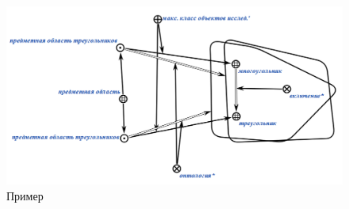\begin{frame}{\\}
	\begin{figure}[H]
		\includegraphics[scale=0.3]{./part1/pictures/ontology3.png}
		\caption{Пример}
	\end{figure}
\end{frame}


